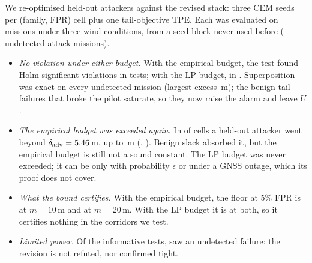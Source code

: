 We re-optimised \nRevAttackers{} held-out attackers against the revised stack:
three CEM seeds per (family, FPR) cell plus one tail-objective TPE. Each was
evaluated on \nROneEvalN{} missions under three wind conditions, from a seed
block never used before (\nRevUndet{} undetected-attack missions).
\begin{itemize}
\item \emph{No violation under either budget.} With the empirical budget, the test found
  \nRevEmpViol{} Holm-significant violations in \nRevEmpTests{} tests; with the
  LP budget, \nRevLpViol{} in \nRevLpTests. Superposition was exact on every
  undetected mission (largest excess \nRevSupUnsat\,m); the benign-tail failures
  that broke the pilot saturate, so they now raise the alarm and leave $U$.
\item \emph{The empirical budget was exceeded again.} In \nRevEmpExceed{} of
  \nRevEmpCells{} cells a held-out attacker went beyond $\delta_{\mathrm{adv}}=5.46$\,m,
  up to \nRevAdvMax\,m (\nRevAdvMaxFam, \nRevAdvMaxOpt). Benign slack absorbed it,
  but the empirical budget is still not a sound constant. The LP budget was never
  exceeded; it can be only with probability $\epsilon$ or under a GNSS outage,
  which its proof does not cover.
\item \emph{What the bound certifies.} With the empirical budget, the floor at 5\% FPR
  is \nRevEmpFloorTen{} at $m=10$\,m and \nRevEmpFloorTwenty{} at $m=20$\,m.
  With the LP budget it is \nRevLpFloorTen{} at both, so it certifies nothing
  in the corridors we test.
\item \emph{Limited power.} Of the \nRevEmpInformative{} informative tests,
  \nRevEmpFailInf{} saw an undetected failure: the revision is not refuted,
  nor confirmed tight.
\end{itemize}

